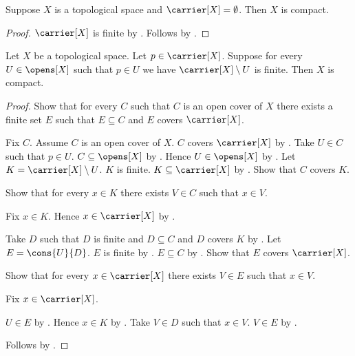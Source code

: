 \begin{corollary}\label{empty_topological_space_is_compact}
    Suppose $X$ is a topological space and $\carrier[X]=\emptyset$.
    Then $X$ is compact.
\end{corollary}
\begin{proof}
    $\carrier[X]$ is finite by .
    Follows by .
\end{proof}

\begin{theorem}\label{cofinite_neighbourhood_point_implies_compact}
    Let $X$ be a topological space.
    Let $p\in\carrier[X]$.
    Suppose for every $U\in\opens[X]$ such that $p\in U$ we have
        $\carrier[X]\setminus U$ is finite.
    Then $X$ is compact.
\end{theorem}
\begin{proof}
    Show that for every $C$ such that $C$ is an open cover of $X$
        there exists a finite set $E$ such that $E\subseteq C$ and
            $E$ covers $\carrier[X]$.
    \begin{subproof}
        Fix $C$.
        Assume $C$ is an open cover of $X$.
        $C$ covers $\carrier[X]$ by .
        Take $U\in C$ such that $p\in U$.
        $C\subseteq\opens[X]$ by .
        Hence $U\in\opens[X]$ by .
        Let $K=\carrier[X]\setminus U$.
        $K$ is finite.
        $K\subseteq\carrier[X]$ by .
        Show that $C$ covers $K$.
        \begin{subproof}
            Show that for every $x\in K$ there exists $V\in C$
                such that $x\in V$.
            \begin{subproof}
                Fix $x\in K$.
                Hence $x\in\carrier[X]$ by .
            \end{subproof}
        \end{subproof}
        Take $D$ such that $D$ is finite and $D\subseteq C$ and
            $D$ covers $K$
            by .
        Let $E=\cons{U}{D}$.
        $E$ is finite by .
        $E\subseteq C$ by .
        Show that $E$ covers $\carrier[X]$.
        \begin{subproof}
            Show that for every $x\in\carrier[X]$ there exists $V\in E$
                such that $x\in V$.
            \begin{subproof}
                Fix $x\in\carrier[X]$.
                \begin{byCase}
                        $U\in E$ by .
                        Hence $x\in K$ by .
                        Take $V\in D$ such that $x\in V$.
                        $V\in E$ by .
                \end{byCase}
            \end{subproof}
        \end{subproof}
    \end{subproof}
    Follows by .
\end{proof}

